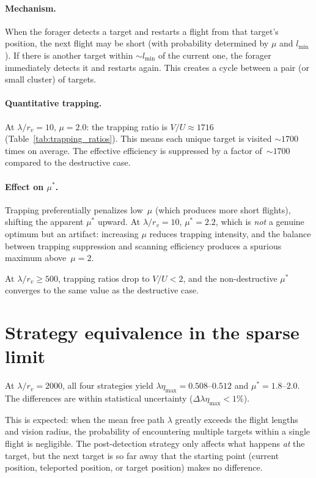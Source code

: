 \paragraph{Mechanism.}
When the forager detects a target and restarts a flight from
that target's position, the next flight may be short
(with probability determined by $\mu$ and $l_{\min}$).  If
there is another target within $\sim l_{\min}$ of the current
one, the forager immediately detects it and restarts again.
This creates a cycle between a pair (or small cluster) of
targets.

\paragraph{Quantitative trapping.}
At $\lambda/r_v = 10$, $\mu = 2.0$: the trapping ratio is
$V/U \approx 1716$ (Table~\ref{tab:trapping_ratios}).  This
means each unique target is visited ${\sim}1700$ times on average.  The effective efficiency is suppressed by a
factor of~${\sim}1700$ compared to the destructive case.

\paragraph{Effect on $\mu^*$.}
Trapping preferentially penalizes low~$\mu$ (which produces
more short flights), shifting the apparent $\mu^*$ upward.
At $\lambda/r_v = 10$, $\mu^* = 2.2$, which is \emph{not}
a genuine optimum but an artifact: increasing $\mu$ reduces
trapping intensity, and the balance between trapping
suppression and scanning efficiency produces a spurious maximum
above~$\mu = 2$.

At $\lambda/r_v \geq 500$, trapping ratios drop to $V/U < 2$,
and the non-destructive $\mu^*$ converges to the same value as
the destructive case.

\section{Strategy equivalence in the sparse limit}

At $\lambda/r_v = 2000$, all four strategies yield
$\lambda\eta_{\max} = 0.508$--$0.512$ and $\mu^* = 1.8$--$2.0$.
The differences are within statistical uncertainty
($\Delta\lambda\eta_{\max} < 1\%$).

This is expected: when the mean free path $\lambda$ greatly
exceeds the flight lengths and vision radius, the probability
of encountering multiple targets within a single flight is
negligible.  The post-detection strategy only affects what
happens \emph{at} the target, but the next target is so far
away that the starting point (current position, teleported
position, or target position) makes no difference.

